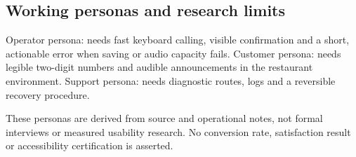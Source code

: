 \subsection{Working personas and research limits}

Operator persona: needs fast keyboard calling, visible confirmation and a short, actionable error when saving or audio capacity fails. Customer persona: needs legible two-digit numbers and audible announcements in the restaurant environment. Support persona: needs diagnostic routes, logs and a reversible recovery procedure.

These personas are derived from source and operational notes, not formal interviews or measured usability research. No conversion rate, satisfaction result or accessibility certification is asserted.
